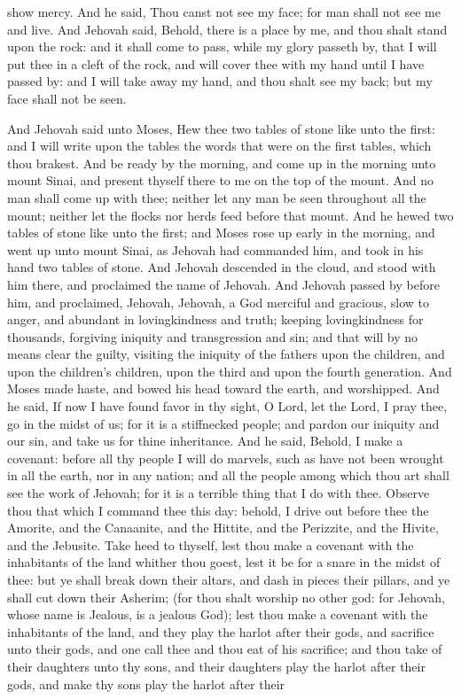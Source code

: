 show mercy. And he said, Thou canst not see my face; for man shall not see me and live. And Jehovah said, Behold, there is a place by me, and thou shalt stand upon the rock: and it shall come to pass, while my glory passeth by, that I will put thee in a cleft of the rock, and will cover thee with my hand until I have passed by: and I will take away my hand, and thou shalt see my back; but my face shall not be seen. 

And Jehovah said unto Moses, Hew thee two tables of stone like unto the first: and I will write upon the tables the words that were on the first tables, which thou brakest. And be ready by the morning, and come up in the morning unto mount Sinai, and present thyself there to me on the top of the mount. And no man shall come up with thee; neither let any man be seen throughout all the mount; neither let the flocks nor herds feed before that mount. And he hewed two tables of stone like unto the first; and Moses rose up early in the morning, and went up unto mount Sinai, as Jehovah had commanded him, and took in his hand two tables of stone. And Jehovah descended in the cloud, and stood with him there, and proclaimed the name of Jehovah. And Jehovah passed by before him, and proclaimed, Jehovah, Jehovah, a God merciful and gracious, slow to anger, and abundant in lovingkindness and truth; keeping lovingkindness for thousands, forgiving iniquity and transgression and sin; and that will by no means clear the guilty, visiting the iniquity of the fathers upon the children, and upon the children’s children, upon the third and upon the fourth generation. And Moses made haste, and bowed his head toward the earth, and worshipped. And he said, If now I have found favor in thy sight, O Lord, let the Lord, I pray thee, go in the midst of us; for it is a stiffnecked people; and pardon our iniquity and our sin, and take us for thine inheritance.  And he said, Behold, I make a covenant: before all thy people I will do marvels, such as have not been wrought in all the earth, nor in any nation; and all the people among which thou art shall see the work of Jehovah; for it is a terrible thing that I do with thee. Observe thou that which I command thee this day: behold, I drive out before thee the Amorite, and the Canaanite, and the Hittite, and the Perizzite, and the Hivite, and the Jebusite. Take heed to thyself, lest thou make a covenant with the inhabitants of the land whither thou goest, lest it be for a snare in the midst of thee: but ye shall break down their altars, and dash in pieces their pillars, and ye shall cut down their Asherim; (for thou shalt worship no other god: for Jehovah, whose name is Jealous, is a jealous God); lest thou make a covenant with the inhabitants of the land, and they play the harlot after their gods, and sacrifice unto their gods, and one call thee and thou eat of his sacrifice; and thou take of their daughters unto thy sons, and their daughters play the harlot after their gods, and make thy sons play the harlot after their 